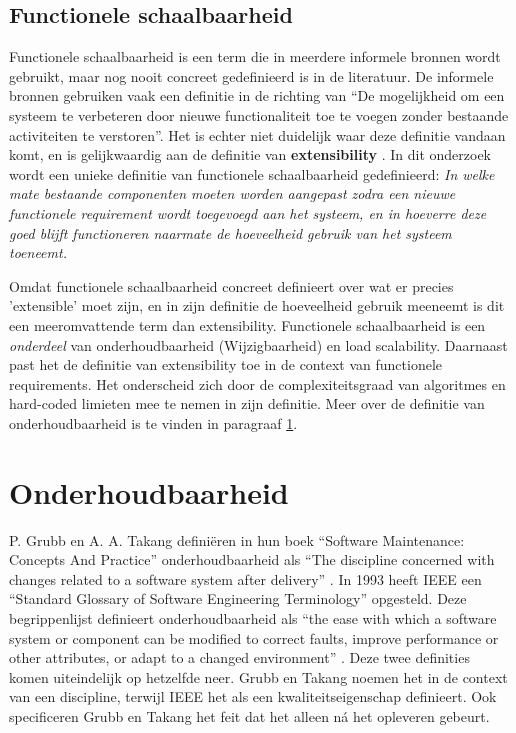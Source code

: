 \subsection{Functionele schaalbaarheid} \label{FunctioneleSchaalbaarheid}
Functionele schaalbaarheid is een term die in meerdere informele bronnen wordt gebruikt, maar nog nooit concreet gedefinieerd is in de literatuur. De informele bronnen gebruiken vaak een definitie in de richting van \enquote{De mogelijkheid om een systeem te verbeteren door nieuwe functionaliteit toe te voegen zonder bestaande activiteiten te verstoren}. Het is echter niet duidelijk waar deze definitie vandaan komt, en is gelijkwaardig aan de definitie van \textbf{extensibility} \parencite{Extensibility, DesigningExtensibility}. In dit onderzoek wordt een unieke definitie van functionele schaalbaarheid gedefinieerd: \textit{In welke mate bestaande componenten moeten worden aangepast zodra een nieuwe functionele requirement wordt toegevoegd aan het systeem, en in hoeverre deze goed blijft functioneren naarmate de hoeveelheid gebruik van het systeem toeneemt.} 

Omdat functionele schaalbaarheid concreet definieert over wat er precies 'extensible' moet zijn, en in zijn definitie de hoeveelheid gebruik meeneemt is dit een meeromvattende term dan extensibility. Functionele schaalbaarheid is een \textit{onderdeel} van onderhoudbaarheid (Wijzigbaarheid) en load scalability. Daarnaast past het de definitie van extensibility toe in de context van functionele requirements. Het onderscheid zich door de complexiteitsgraad van algoritmes en hard-coded limieten mee te nemen in zijn definitie. Meer over de definitie van onderhoudbaarheid is te vinden in paragraaf \ref{onderhoudbaarheid}.

\section{Onderhoudbaarheid} \label{onderhoudbaarheid}
P. Grubb en A. A. Takang definiëren in hun boek \enquote{Software Maintenance: Concepts And Practice} onderhoudbaarheid als \enquote{The discipline concerned with changes related to a software system after delivery} \parencite{MaintenanceConcepts}. In 1993 heeft IEEE een \enquote{Standard Glossary of Software Engineering Terminology} opgesteld. Deze begrippenlijst definieert onderhoudbaarheid als \enquote{the ease with which a software system or component can be modified to correct faults, improve performance or other attributes, or adapt to a changed environment} \parencite{SENTerminology}. Deze twee definities komen uiteindelijk op hetzelfde neer. Grubb en Takang noemen het in de context van een discipline, terwijl IEEE het als een kwaliteitseigenschap definieert. Ook specificeren Grubb en Takang het feit dat het alleen ná het opleveren gebeurt.

